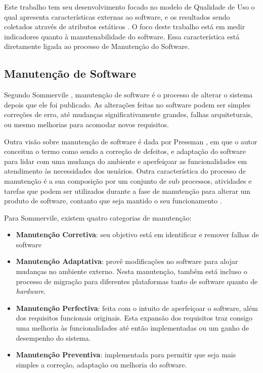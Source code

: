 Este trabalho tem seu desenvolvimento focado no modelo de Qualidade de Uso 
o qual apresenta características externas ao software, e os resultados sendo coletados através de atributos estáticos \cite{Square}. O foco deste trabalho está em medir indicadores quanto à manutenabilidade do software. Essa característica está diretamente ligada ao processo de Manutenção do Software.  

\subsection{Manutenção de Software}
Segundo Sommervile \cite{sommervile}, manutenção de software é o processo de alterar o sistema depois que ele foi publicado. As alterações feitas no software podem ser simples correções de erro, até mudanças significativamente grandes, falhas arquiteturais, ou mesmo melhorias para acomodar novos requisitos.

Outra visão sobre manutenção de software é dada por Pressman \cite{pressman}, em que o autor conceitua o termo como sendo a correção de defeitos, e adaptação do software para lidar com uma mudança do ambiente e aperfeiçoar as funcionalidades em atendimento às necessidades dos usuários. Outra característica do processo de manutenção é a sua composição por um conjunto de sub processos, atividades e tarefas que podem ser utilizados durante a fase de manutenção para alterar um produto de software, contanto que seja mantido o seu funcionamento \cite{calazans_avaliacao_2005}.

Para Sommervile, existem quatro categorias de manutenção:
\begin{itemize}
\item \textbf{Manutenção Corretiva}: seu objetivo está em identificar e remover falhas de software
\item \textbf{Manutenção Adaptativa}: provê modificações no software para alojar mudanças no ambiente externo. Nesta manutenção, também está incluso o processo de migração para diferentes plataformas tanto de software quanto de \textit{hardware}.
\item \textbf{Manutenção Perfectiva}: feita com o intuito de aperfeiçoar o software, além dos requisitos funcionais originais. Esta expansão dos requisitos traz consigo uma melhoria às funcionalidades até então implementadas ou um ganho de desempenho do sistema.
\item \textbf{Manutenção Preventiva}: implementada para permitir que seja mais simples a correção, adaptação ou melhoria do software.
\end{itemize}

